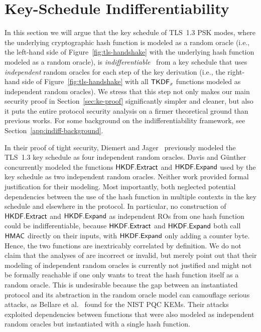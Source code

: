 \section{Key-Schedule Indifferentiability}\label{sec:ks-indiff}

In this section we will argue that the key schedule of TLS~1.3 PSK modes, where the underlying cryptographic hash function is modeled as a random oracle (i.e., the left-hand side of Figure~\ref{fig:tls-handshake} with the underlying hash function modeled as a random oracle), is \emph{indifferentiable}~\cite{TCC:MauRenHol04} from a key schedule that uses \emph{independent} random oracles for each step of the key derivation (i.e., the right-hand side of Figure~\ref{fig:tls-handshake} with all $\mathsf{TKDF}_x$ functions modeled as independent random oracles).
%
We stress that this step not only makes our main security proof in Section~\ref{sec:ke-proof} significantly simpler and cleaner, but also it puts the entire protocol security analysis on a firmer theoretical ground than previous works.
For some background on the indifferentiability framework, see
	Section~\ref{app:indiff-background}.

In their proof of tight security, Diemert and Jager~\cite{JC:DieJag21} previously modeled the TLS~1.3 key schedule as four independent random oracles.
Davis and Günther~\cite{ACNS:DavGun21} concurrently modeled the functions $\mathsf{HKDF.Extract}$ and $\mathsf{HKDF.Expand}$ used by the key schedule as two independent random oracles. 
Neither work provided formal justification for their modeling. 
Most importantly, both neglected potential dependencies between the use of the hash function in multiple contexts in the key schedule and elsewhere in the protocol. 
In particular, no construction of $\mathsf{HKDF.Extract}$ and $\mathsf{HKDF.Expand}$ as independent ROs from one hash function could be indifferentiable, because $\mathsf{HKDF.Extract}$ and $\mathsf{HKDF.Expand}$ both call $\mathsf{HMAC}$ directly on their inputs, with $\mathsf{HKDF.Expand}$ only adding a counter byte. 
Hence, the two functions are inextricably correlated by definition. 
We do not claim that the analyses of \cite{JC:DieJag21,ACNS:DavGun21} are incorrect or invalid, but merely point out that their modeling of independent random oracles is currently not justified and might not be formally reachable if one only wants to treat the hash function itself as a random oracle.
%
This is undesirable because the gap between an instantiated protocol and its abstraction in the random oracle model can camouflage serious attacks, as Bellare et al.~\cite{EC:BelDavGun20} found for the NIST PQC KEMs. 
Their attacks exploited dependencies between functions that were also modeled as independent random oracles but instantiated with a single hash function.

